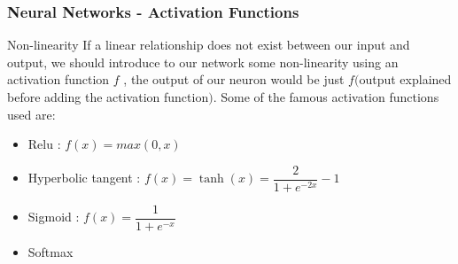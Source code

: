 \documentclass{beamer}
\begin{document}
\begin{frame}
\frametitle{Neural Networks - Activation Functions}
\begin{block}{Non-linearity}
If a linear relationship does not exist between our input and output, we should introduce to our network some non-linearity using an activation function $ f $ , the output of our neuron would be just $ f( $output explained before adding the activation function$ ) $. Some of the famous activation functions used are:\\
\begin{itemize}
\item Relu : $ f(x) = max(0,x) $
\item Hyperbolic tangent : $ f(x) = \tanh(x) = \dfrac{2}{1 + e^{-2x}} - 1 $
\item Sigmoid : $ f(x) = \dfrac{1}{1 + e^{-x}} $
\item Softmax
\end{itemize}
\end{block}
\end{frame}
\end{document}
